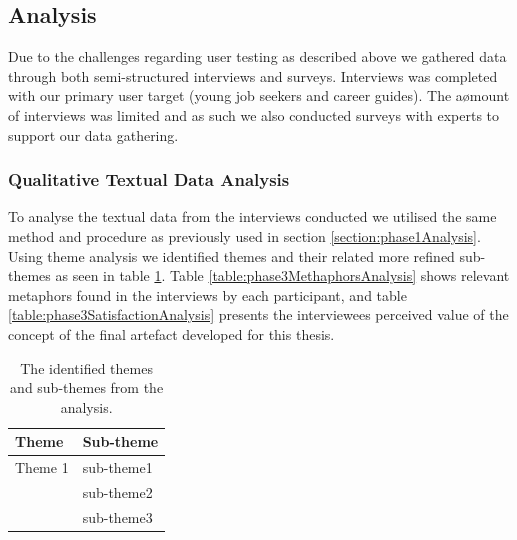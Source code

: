 






\subsection{Analysis}
Due to the challenges regarding user testing as described above we gathered data through both semi-structured interviews and surveys. Interviews was completed with our primary user target (young job seekers and career guides). The aømount of interviews was limited and as such we also conducted surveys with experts to support our data gathering.      


\subsubsection{Qualitative Textual Data Analysis}
To analyse the textual data from the interviews conducted we utilised the same method and procedure as previously used in section \ref{section:phase1Analysis}. Using theme analysis we identified themes and their related more refined sub-themes as seen in table \ref{table:phase3ThemeAnalysis}. Table \ref{table:phase3MethaphorsAnalysis} shows relevant metaphors found in the interviews by each participant, and table \ref{table:phase3SatisfactionAnalysis} presents the interviewees perceived value of the concept of the final artefact developed for this thesis.


\begin{table}[H]
      \centering
        \begin{tabular}{ll}
        \toprule
        Theme & Sub-theme \\
        \midrule
       Theme 1 & sub-theme1\\
        & sub-theme2 \\\vspace{0.2cm}
        & sub-theme3 \\
       
        \bottomrule
        \end{tabular}
        \caption{The identified themes and sub-themes from the analysis.}
        \label{table:phase3ThemeAnalysis}
\end{table}






